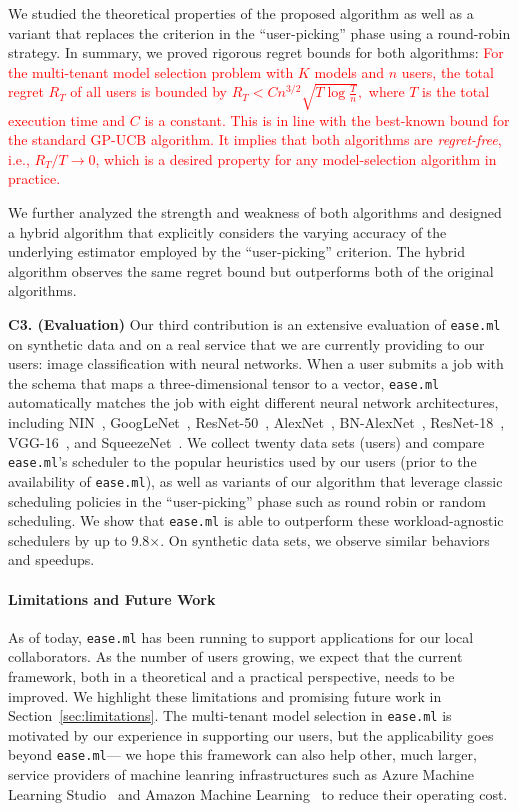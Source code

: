 \documentclass[letterpaper]{vldb}
\newcommand{\eml}{\texttt{ease.ml}\xspace}
\begin{document}
We studied the theoretical properties of the proposed algorithm as well as a variant that replaces the criterion in the ``user-picking'' phase using a round-robin strategy.
In summary, we proved rigorous regret bounds for both algorithms: \textcolor{red}{For the multi-tenant model selection problem 
with $K$ models and $n$ users, 
the total regret $R_T$ of all users is bounded by 
$
R_T < C n^{3/2}\sqrt{T\log \frac{T}{n}}, 
$
where $T$ is the total execution time
and $C$ is a constant.
This is in line with the best-known bound for the standard GP-UCB algorithm.
It implies that both algorithms are \emph{regret-free}, i.e., $R_T/T \rightarrow 0$, which is a desired property for any model-selection algorithm in practice.
}

We further analyzed the strength and weakness of both algorithms and designed a hybrid algorithm that explicitly considers
the varying accuracy of the underlying estimator employed by the ``user-picking'' criterion.
The hybrid algorithm observes the same regret bound but outperforms both of the original algorithms.


\vspace{0.5em}
\noindent
{\bf C3. (Evaluation)} Our third contribution is an extensive
evaluation of \eml on synthetic data and on a real service that we are currently providing to our users: image classification 
with neural networks.
When a user submits a job with the schema
that maps a three-dimensional tensor to
a vector, \eml automatically matches the job with eight
different neural network architectures, including
NIN~\cite{XXX}, GoogLeNet~\cite{XXX}, ResNet-50~\cite{XXX}, AlexNet~\cite{XXX},
BN-AlexNet~\cite{XXX}, ResNet-18~\cite{XXX}, VGG-16~\cite{XXX},
and SqueezeNet~\cite{XXX}. We collect twenty 
data sets (users) and compare
\eml's scheduler to the popular heuristics 
used by our users (prior to the availability of \eml), as well as variants of our algorithm that leverage classic scheduling policies in the ``user-picking'' phase such as round robin or random scheduling.
We show that \eml is able to outperform
these workload-agnostic schedulers
by up to 9.8$\times$. On synthetic data sets,
we observe similar behaviors and speedups.

\vspace{-0.5em}
\paragraph*{Limitations and Future Work}
As of today, \eml has been running to support 
applications for our local collaborators. 
As the number of users growing, we
expect that the current framework, both in a
theoretical and a practical perspective,
needs to be improved. We highlight these
limitations and promising future work in 
Section~\ref{sec:limitations}. The multi-tenant
model selection in \eml is motivated by
our experience in supporting our users, but 
the applicability goes beyond \eml --- we hope
this framework can also help other, much larger, service providers
of machine leanring infrastructures such as 
Azure Machine Learning Studio~\cite{XXX}
and Amazon Machine Learning~\cite{XXX}
to reduce their operating
cost.
\end{document}
